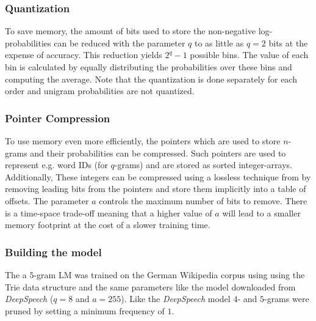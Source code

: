 \subsubsection{Quantization}
To save memory, the amount of bits used to store the non-negative log-probabilities can be reduced with the parameter $q$ to as little as $q = 2$ bits at the expense of accuracy. This reduction yields $2^q -1$ possible bins. The value of each bin is calculated by equally distributing the probabilities over these bins and computing the average. Note that the quantization is done separately for each order and unigram probabilities are not quantized.

\subsubsection{Pointer Compression}
To use memory even more efficiently, the pointers which are used to store $n$-grams and their probabilities can be compressed. Such pointers are used to represent e.g. word IDs (for $q$-grams) and are stored as sorted integer-arrays. Additionally, These integers can be compressed using a lossless technique from \cite{raj_lossless} by removing leading bits from the pointers and store them implicitly into a table of offsets. The parameter $a$ controls the maximum number of bits to remove. There is a time-space trade-off meaning that a higher value of $a$ will lead to a smaller memory footprint at the cost of a slower training time.

\subsubsection{Building the model}

The a $5$-gram \ac{LM} was trained on the German Wikipedia corpus using  using the Trie data structure and the same parameters like the model downloaded from \textit{DeepSpeech} ($q=8$ and $a=255$). Like the \textit{DeepSpeech} model $4$- and $5$-grams were pruned by setting a minimum frequency of $1$.


